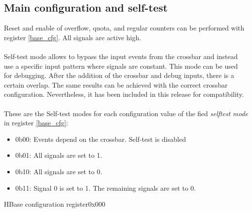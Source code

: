 \subsection{Main configuration and self-test}
Reset and enable of overflow, quota, and regular counters can be performed with register \ref{base_cfg}. All signals are active high.\\
\\
Self-test mode allows to bypass the input events from the crossbar and instead use a specific input pattern where signals are constant. This mode can be used for debugging. After the addition of the crossbar and debug inputs, there is a certain overlap. The same results can be achieved with the correct crossbar configuration. Nevertheless, it has been included in this release for compatibility.\\
\\
These are the Self-test modes for each configuration value of the fied \textit{selftest mode} in register \ref{base_cfg}:
\begin{itemize}
	\item 0b00: Events depend on the crossbar. Self-test is disabled
	\item 0b01: All signals are set to 1.
	\item 0b10: All signals are set to 0.
	\item 0b11: Signal 0 is set to 1.  The remaining signals are set to 0.
\end{itemize}

 \begin{register}{H}{Base configuration register}{0x000}
   \label{base_cfg}
   \regnewline
  \end{register}

